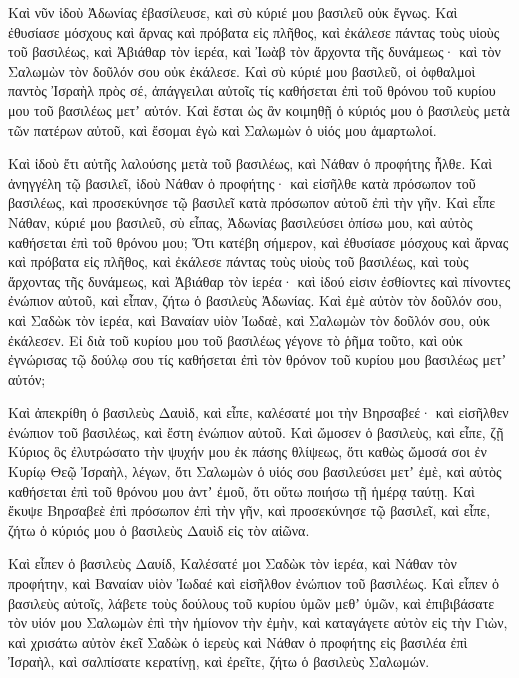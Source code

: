 {Καὶ νῦν ἰδοὺ Ἀδωνίας ἐβασίλευσε, καὶ σὺ κύριέ μου βασιλεῦ οὐκ ἔγνως.
Καὶ ἐθυσίασε μόσχους καὶ ἄρνας καὶ πρόβατα εἰς πλῆθος, καὶ ἐκάλεσε πάντας τοὺς υἱοὺς τοῦ βασιλέως, καὶ Ἀβιάθαρ τὸν ἱερέα, καὶ Ἰωὰβ τὸν ἄρχοντα τῆς δυνάμεως· καὶ τὸν Σαλωμὼν τὸν δοῦλόν σου οὐκ ἐκάλεσε.
Καὶ σὺ κύριέ μου βασιλεῦ, οἱ ὀφθαλμοὶ παντὸς Ἰσραὴλ πρὸς σέ, ἀπάγγειλαι αὐτοῖς τίς καθήσεται ἐπὶ τοῦ θρόνου τοῦ κυρίου μου τοῦ βασιλέως μετʼ αὐτόν.
Καὶ ἔσται ὡς ἂν κοιμηθῇ ὁ κύριός μου ὁ βασιλεὺς μετὰ τῶν πατέρων αὐτοῦ, καὶ ἔσομαι ἐγὼ καὶ Σαλωμὼν ὁ υἱός μου ἁμαρτωλοί.
\par }{\PP {}Καὶ ἰδοὺ ἔτι αὐτῆς λαλούσης μετὰ τοῦ βασιλέως, καὶ Νάθαν ὁ προφήτης ἦλθε.
Καὶ ἀνηγγέλη τῷ βασιλεῖ, ἰδοὺ Νάθαν ὁ προφήτης· καὶ εἰσῆλθε κατὰ πρόσωπον τοῦ βασιλέως, καὶ προσεκύνησε τῷ βασιλεῖ κατὰ πρόσωπον αὐτοῦ ἐπὶ τὴν γῆν.
Καὶ εἶπε Νάθαν, κύριέ μου βασιλεῦ, σὺ εἶπας, Ἀδωνίας βασιλεύσει ὀπίσω μου, καὶ αὐτὸς καθήσεται ἐπὶ τοῦ θρόνου μου;
Ὅτι κατέβη σήμερον, καὶ ἐθυσίασε μόσχους καὶ ἄρνας καὶ πρόβατα εἰς πλῆθος, καὶ ἐκάλεσε πάντας τοὺς υἱοὺς τοῦ βασιλέως, καὶ τοὺς ἄρχοντας τῆς δυνάμεως, καὶ Ἀβιάθαρ τὸν ἱερέα· καὶ ἰδού εἰσιν ἐσθίοντες καὶ πίνοντες ἐνώπιον αὐτοῦ, καὶ εἶπαν, ζήτω ὁ βασιλεὺς Ἀδωνίας.
Καὶ ἐμὲ αὐτὸν τὸν δοῦλόν σου, καὶ Σαδὼκ τὸν ἱερέα, καὶ Βαναίαν υἱὸν Ἰωδαὲ, καὶ Σαλωμὼν τὸν δοῦλόν σου, οὐκ ἐκάλεσεν.
Εἰ διὰ τοῦ κυρίου μου τοῦ βασιλέως γέγονε τὸ ῥῆμα τοῦτο, καὶ οὐκ ἐγνώρισας τῷ δούλῳ σου τίς καθήσεται ἐπὶ τὸν θρόνον τοῦ κυρίου μου βασιλέως μετʼ αὐτόν;
\par }{\PP {}Καὶ ἀπεκρίθη ὁ βασιλεὺς Δαυὶδ, καὶ εἶπε, καλέσατέ μοι τὴν Βηρσαβεέ· καὶ εἰσῆλθεν ἐνώπιον τοῦ βασιλέως, καὶ ἔστη ἐνώπιον αὐτοῦ.
Καὶ ὤμοσεν ὁ βασιλεὺς, καὶ εἶπε, ζῇ Κύριος ὃς ἐλυτρώσατο τὴν ψυχήν μου ἐκ πάσης θλίψεως,
ὅτι καθὼς ὤμοσά σοι ἐν Κυρίῳ Θεῷ Ἰσραὴλ, λέγων, ὅτι Σαλωμὼν ὁ υἱός σου βασιλεύσει μετʼ ἐμὲ, καὶ αὐτὸς καθήσεται ἐπὶ τοῦ θρόνου μου ἀντʼ ἐμοῦ, ὅτι οὕτω ποιήσω τῇ ἡμέρᾳ ταύτῃ.
Καὶ ἔκυψε Βηρσαβεὲ ἐπὶ πρόσωπον ἐπὶ τὴν γῆν, καὶ προσεκύνησε τῷ βασιλεῖ, καὶ εἶπε, ζήτω ὁ κύριός μου ὁ βασιλεὺς Δαυὶδ εἰς τὸν αἰῶνα.
\par }{\PP {}Καὶ εἶπεν ὁ βασιλεὺς Δαυίδ, Καλέσατέ μοι Σαδὼκ τὸν ἱερέα, καὶ Νάθαν τὸν προφήτην, καὶ Βαναίαν υἱὸν Ἰωδαέ καὶ εἰσῆλθον ἐνώπιον τοῦ βασιλέως.
Καὶ εἶπεν ὁ βασιλεὺς αὐτοῖς, λάβετε τοὺς δούλους τοῦ κυρίου ὑμῶν μεθʼ ὑμῶν, καὶ ἐπιβιβάσατε τὸν υἱόν μου Σαλωμὼν ἐπὶ τὴν ἡμίονον τὴν ἐμὴν, καὶ καταγάγετε αὐτὸν εἰς τὴν Γιὼν,
καὶ χρισάτω αὐτὸν ἐκεῖ Σαδὼκ ὁ ἱερεὺς καὶ Νάθαν ὁ προφήτης εἰς βασιλέα ἐπὶ Ἰσραὴλ, καὶ σαλπίσατε κερατίνῃ, καὶ ἐρεῖτε, ζήτω ὁ βασιλεὺς Σαλωμών.
}
